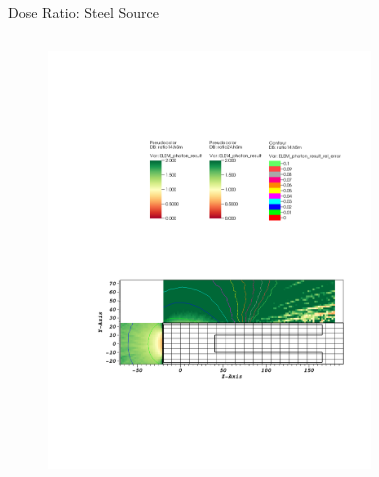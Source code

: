 \documentclass{beamer}
\begin{document}
\begin{frame}{Dose Ratio: Steel Source}
\begin{columns}[T]
        \begin{figure}
                \includegraphics[scale=0.49,trim={6.75cm 16.5cm 11cm 6cm},clip]{figs/ratio_steel_novoid.pdf}
        \end{figure}
        \begin{figure}

\end{figure}
\end{columns}
\end{frame}
\end{document}
